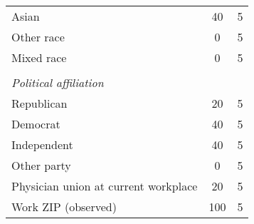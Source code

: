 \begin{tabular}{l*{1}{cc}}
Asian           &       40&        5\\
Other race      &        0&        5\\
Mixed race      &        0&        5\\
\vspace{0.1em} \\ \emph{Political affiliation}&         &         \\
Republican      &       20&        5\\
Democrat        &       40&        5\\
Independent     &       40&        5\\
Other party     &        0&        5\\
Physician union at current workplace&       20&        5\\
Work ZIP (observed)&      100&        5\\
\bottomrule
\end{tabular}
